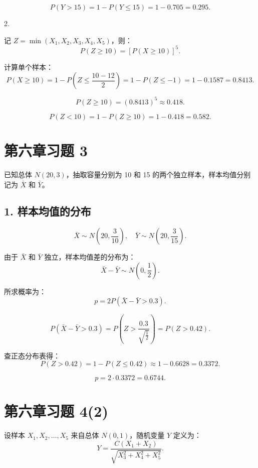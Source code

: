 \documentclass[twoside]{article}
\begin{document}
\begin{ans}{2}{2}
    \[
    P(Y > 15) = 1 - P(Y \leq 15) = 1 - 0.705 = 0.295.
    \]
    
    2.
    
    记 \( Z = \min(X_1, X_2, X_3, X_4, X_5) \)，则：
    \[
    P(Z \geq 10) = [P(X \geq 10)]^5.
    \]
    
    计算单个样本：
    \[
    P(X \geq 10) = 1 - P(Z \leq \frac{10 - 12}{2}) = 1 - P(Z \leq -1) = 1 - 0.1587 = 0.8413.
    \]
    
    \[
    P(Z \geq 10) = (0.8413)^5 \approx 0.418.
    \]
    
    \[
    P(Z < 10) = 1 - P(Z \geq 10) = 1 - 0.418 = 0.582.
    \]

\end{ans}

\section{第六章习题 3}

\begin{ans}{3}{3}

已知总体 \( N(20, 3) \)，抽取容量分别为 10 和 15 的两个独立样本，样本均值分别记为 \( \bar{X} \) 和 \( \bar{Y} \)。

\subsection*{1. 样本均值的分布}

\[
\bar{X} \sim N\left( 20, \frac{3}{10} \right), \quad \bar{Y} \sim N\left( 20, \frac{3}{15} \right).
\]

由于 \( \bar{X} \) 和 \( \bar{Y} \) 独立，样本均值差的分布为：
\[
\bar{X} - \bar{Y} \sim N\left( 0, \frac{1}{2} \right).
\]

所求概率为：
\[
p = 2P\left( \bar{X} - \bar{Y} > 0.3 \right).
\]

\[
P\left( \bar{X} - \bar{Y} > 0.3 \right) = P\left( Z > \frac{0.3}{\sqrt{\frac{1}{2}}} \right) = P(Z > 0.42).
\]

查正态分布表得：
\[
P(Z > 0.42) = 1 - P(Z \leq 0.42) \approx 1 - 0.6628 = 0.3372.
\]

\[
p = 2 \cdot 0.3372 = 0.6744.
\]

\end{ans}

\section{第六章习题 4(2)}


设样本 \( X_1, X_2, \dots, X_5 \) 来自总体 \( N(0, 1) \)，随机变量 \( Y \) 定义为：
\[
Y = \frac{C(X_1 + X_2)}{\sqrt{X_3^2 + X_4^2 + X_5^2}}.
\]
\end{document}
